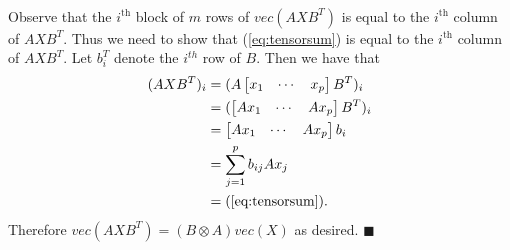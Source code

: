 \documentclass[letterpaper,12pt,oneside,onecolumn]{article}
\begin{document}
\paragraph{}
Observe that the $i^\text{th}$ block of $m$ rows of $vec(AXB^T)$ is equal to the $i^\text{th}$ column of $AXB^T$. Thus we need to show that (\ref{eq:tensorsum}) is equal to the $i^\text{th}$ column of $AXB^T$. Let $b_i^T$ denote the $i^{th}$ row of $B$. Then we have that
\begin{align*}
(AXB^T)_i &= (A\begin{bmatrix} x_1 & \cdots & x_p\end{bmatrix}B^T)_i \\
&=(\begin{bmatrix} Ax_1 &\cdots & Ax_p \end{bmatrix} B^T)_i \\
&= \begin{bmatrix} Ax_1 &\cdots & Ax_p \end{bmatrix} b_i \\
&= \sum_{j=1}^p b_{ij}Ax_j \\
&= (\ref{eq:tensorsum}). 
\end{align*}
Therefore $vec(AXB^T) = (B \otimes A)vec(X)$ as desired. $\blacksquare$
\end{document}
